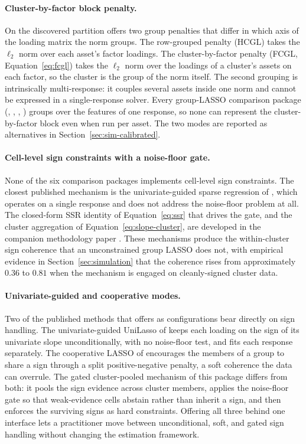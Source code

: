 \documentclass[article]{jss}
\begin{document}
\paragraph{Cluster-by-factor block penalty.}
On the discovered partition  offers two group penalties
that differ in which axis of the loading matrix the norm groups. The
row-grouped penalty (HCGL) takes the $\ell_2$ norm over each asset's factor
loadings. The cluster-by-factor penalty (FCGL,
Equation~\ref{eq:fcgl}) takes the $\ell_2$ norm over the loadings of a
cluster's assets on each factor, so the cluster is the group of the norm
itself. The second grouping is intrinsically multi-response: it couples
several assets inside one norm and cannot be expressed in a
single-response solver. Every group-LASSO comparison package
(, , , ) groups over the
features of one response, so none can represent the cluster-by-factor
block even when run per asset. The two modes are reported as
alternatives in Section~\ref{sec:sim-calibrated}.

\paragraph{Cell-level sign constraints with a noise-floor gate.}
None of the six comparison packages implements cell-level sign
constraints. The closest published mechanism is the univariate-guided
sparse regression of \cite{Chatterjee+Hastie+Tibshirani:2025}, which
operates on a single response and does not address the noise-floor
problem at all. The closed-form SSR identity of Equation~\ref{eq:ssr}
that drives the gate, and the cluster aggregation of
Equation~\ref{eq:slope-cluster}, are developed in the companion
methodology paper \citep{Sepp+Kastenholz:2026sign}.
These mechanisms produce the within-cluster
sign coherence that an unconstrained group LASSO does not, with
empirical evidence in Section~\ref{sec:simulation} that the coherence
rises from approximately $0.36$ to $0.81$ when the mechanism is
engaged on cleanly-signed cluster data.

\paragraph{Univariate-guided and cooperative modes.}
Two of the published methods that  offers as
configurations bear directly on sign handling. The univariate-guided
UniLasso of \cite{Chatterjee+Hastie+Tibshirani:2025} keeps each loading on
the sign of its univariate slope unconditionally, with no noise-floor test,
and fits each response separately. The cooperative LASSO of
\cite{Chiquet+Grandvalet+Charbonnier:2012} encourages the members of a group
to share a sign through a split positive-negative penalty, a soft coherence
the data can overrule. The gated cluster-pooled mechanism of this package
differs from both: it pools the sign evidence across cluster members,
applies the noise-floor gate so that weak-evidence cells abstain rather than
inherit a sign, and then enforces the surviving signs as hard constraints.
Offering all three behind one interface lets a practitioner move between
unconditional, soft, and gated sign handling without changing the estimation
framework.
\end{document}
